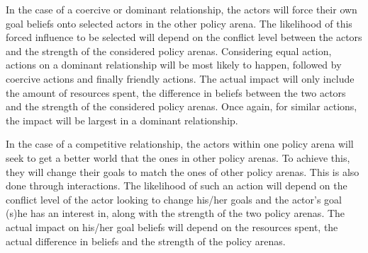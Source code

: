 \documentclass{article}
\begin{document}
In the case of a coercive or dominant relationship, the actors will force their own goal beliefs onto selected actors in the other policy arena. The likelihood of this forced influence to be selected will depend on the conflict level between the actors and the strength of the considered policy arenas. Considering equal action, actions on a dominant relationship will be most likely to happen, followed by coercive actions and finally friendly actions. The actual impact will only include the amount of resources spent, the difference in beliefs between the two actors and the strength of the considered policy arenas. Once again, for similar actions, the impact will be largest in a dominant relationship.

In the case of a competitive relationship, the actors within one policy arena will seek to get a better world that the ones in other policy arenas. To achieve this, they will change their goals to match the ones of other policy arenas. This is also done through interactions. The likelihood of such an action will depend on the conflict level of the actor looking to change his/her goals and the actor’s goal (s)he has an interest in, along with the strength of the two policy arenas. The actual impact on his/her goal beliefs will depend on the resources spent, the actual difference in beliefs and the strength of the policy arenas.
\end{document}

